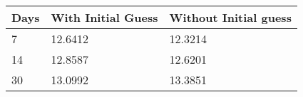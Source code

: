 \begin{tabular}{lll}
Days & With Initial Guess & Without Initial guess \\ 
\hline 
7 & 12.6412 & 12.3214 \\ 
14 & 12.8587 & 12.6201 \\ 
30 & 13.0992 & 13.3851 \\ 
\hline 
\end{tabular}